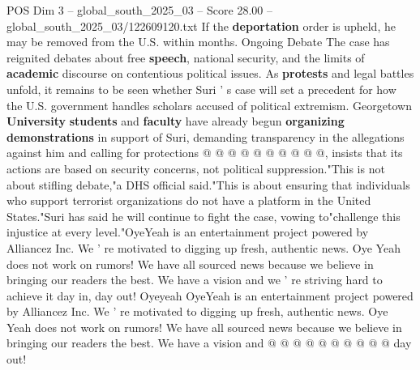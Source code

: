 \begin{textsample}{POS Dim 3 – global\_south\_2025\_03 – Score 28.00 – global\_south\_2025\_03/122609120.txt}
If the \textbf{deportation} order is upheld, he may be removed from the U.S. within months.
Ongoing Debate The case has reignited debates about free \textbf{speech}, national security, and the limits of \textbf{academic} discourse on contentious political issues.
As \textbf{protests} and legal battles unfold, it remains to be seen whether Suri ' s case will set a precedent for how the U.S. government handles scholars accused of political extremism.
Georgetown \textbf{University} \textbf{students} and \textbf{faculty} have already begun \textbf{organizing} \textbf{demonstrations} in support of Suri, demanding transparency in the allegations against him and calling for protections @ @ @ @ @ @ @ @ @ @, insists that its actions are based on security concerns, not political suppression."This is not about stifling debate,"a DHS official said."This is about ensuring that individuals who support terrorist organizations do not have a platform in the United States."Suri has said he will continue to fight the case, vowing to"challenge this injustice at every level."OyeYeah is an entertainment project powered by Alliancez Inc.
We ' re motivated to digging up fresh, authentic news.
Oye Yeah does not work on rumors!
We have all sourced news because we believe in bringing our readers the best.
We have a vision and we ' re striving hard to achieve it day in, day out!
Oyeyeah OyeYeah is an entertainment project powered by Alliancez Inc.
We ' re motivated to digging up fresh, authentic news.
Oye Yeah does not work on rumors!
We have all sourced news because we believe in bringing our readers the best.
We have a vision and @ @ @ @ @ @ @ @ @ @ day out!

\end{textsample}

